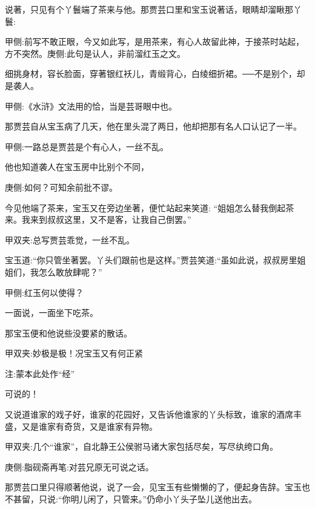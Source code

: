 \begin{parag}
    说著，只见有个丫鬟端了茶来与他。那贾芸口里和宝玉说著话，眼睛却溜瞅那丫鬟:\begin{note}甲侧:前写不敢正眼，今又如此写，是用茶来，有心人故留此神，于接茶时站起，方不突然。庚侧:此句是认人，非前溜红玉之文。\end{note}细挑身材，容长脸面，穿著银红袄儿，青缎背心，白绫细折裙。──不是别个，却是袭人。\begin{note}甲侧:《水浒》文法用的恰，当是芸哥眼中也。\end{note}那贾芸自从宝玉病了几天，他在里头混了两日，他却把那有名人口认记了一半。\begin{note}甲侧:一路总是贾芸是个有心人，一丝不乱。\end{note}他也知道袭人在宝玉房中比别个不同，\begin{note}庚侧:如何？可知余前批不谬。\end{note}今见他端了茶来，宝玉又在旁边坐著，便忙站起来笑道: “姐姐怎么替我倒起茶来。我来到叔叔这里，又不是客，让我自己倒罢。”\begin{note}甲双夹:总写贾芸乖觉，一丝不乱。\end{note}宝玉道:“你只管坐著罢。丫头们跟前也是这样。”贾芸笑道:“虽如此说，叔叔房里姐姐们，我怎么敢放肆呢？”\begin{note}甲侧:红玉何以使得？\end{note}一面说，一面坐下吃茶。
\end{parag}


\begin{parag}
    那宝玉便和他说些没要紧的散话。\begin{note}甲双夹:妙极是极！况宝玉又有何正紧\begin{subnote}注:蒙本此处作“经”\end{subnote}可说的！\end{note}又说道谁家的戏子好，谁家的花园好，又告诉他谁家的丫头标致，谁家的酒席丰盛，又是谁家有奇货，又是谁家有异物。\begin{note}甲双夹:几个“谁家”，自北静王公侯驸马诸大家包括尽矣，写尽纨绔口角。\end{note}\begin{note}庚侧:脂砚斋再笔:对芸兄原无可说之话。\end{note}那贾芸口里只得顺著他说，说了一会，见宝玉有些懒懒的了，便起身告辞。宝玉也不甚留，只说:“你明儿闲了，只管来。”仍命小丫头子坠儿送他出去。
\end{parag}


